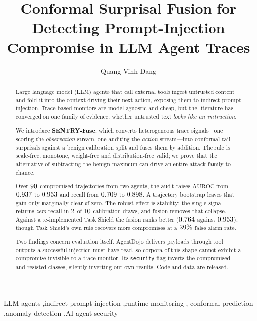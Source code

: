 \documentclass[preprint,12pt,authoryear]{elsarticle}
\theoremstyle{definition}
\begin{document}
\begin{frontmatter}

\title{Conformal Surprisal Fusion for Detecting Prompt-Injection
Compromise in LLM Agent Traces}

\author[buv]{Quang-Vinh Dang}

\begin{abstract}
Large language model (LLM) agents that call external tools ingest untrusted
content and fold it into the context driving their next action, exposing them to
indirect prompt injection. Trace-based monitors are model-agnostic and cheap, but the
literature has converged on one family of evidence: whether untrusted text
\emph{looks like an instruction}.

We introduce \textbf{SENTRY-Fuse}, which converts heterogeneous trace
signals---one scoring the \emph{observation} stream, one auditing the
\emph{action} stream---into conformal tail surprisals against a benign
calibration split and fuses them by addition. The rule is scale-free, monotone,
weight-free and distribution-free valid; we prove that the alternative of
subtracting the benign maximum can drive an entire attack family to chance.

Over $90$ compromised trajectories from two agents, the audit raises
$\mathrm{AUROC}$ from $0.937$ to $0.953$ and recall from
$0.709$ to $0.898$. A trajectory bootstrap leaves that gain only
marginally clear of zero. The robust effect is stability: the single signal returns \emph{zero} recall in $2$ of
$10$ calibration draws, and fusion removes that collapse. Against a
re-implemented Task Shield the fusion ranks better ($0.764$ against
$0.953$), though Task Shield's own rule recovers more compromises at a
$39\%$ false-alarm rate.

Two findings concern evaluation itself. AgentDojo delivers payloads through tool
outputs a successful injection must have read, so corpora of this shape cannot
exhibit a compromise invisible to a trace monitor. Its \texttt{security} flag
inverts the compromised and resisted classes, silently inverting our own results.
Code and data are released.
\end{abstract}

\begin{keyword}
LLM agents \sep indirect prompt injection \sep runtime monitoring \sep
conformal prediction \sep anomaly detection \sep AI agent security
\end{keyword}

\end{frontmatter}
\end{document}
